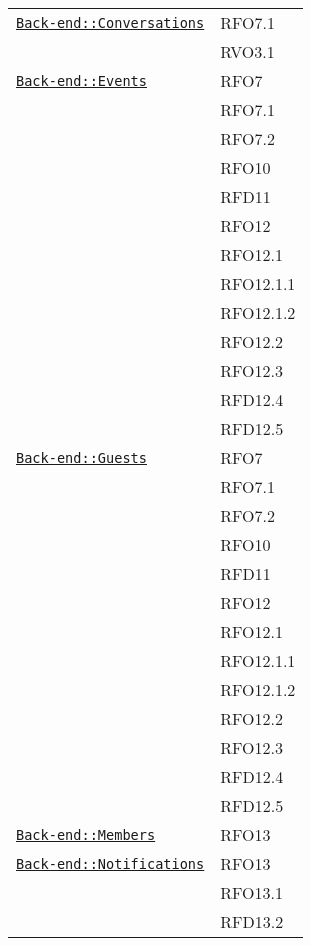 \begin{longtable}{|>{\centering}m{10cm}|m{3cm}<{\centering}|}
\hyperref[Back-end::Conversations]{\texttt{Back-end::Conversations}} & RFO7.1\\
& RVO3.1\\ \hline

\hyperref[Back-end::Events]{\texttt{Back-end::Events}} & RFO7\\
& RFO7.1\\
& RFO7.2\\
& RFO10\\
& RFD11\\
& RFO12\\
& RFO12.1\\
& RFO12.1.1\\
& RFO12.1.2\\
& RFO12.2\\
& RFO12.3\\
& RFD12.4\\
& RFD12.5\\ \hline

\hyperref[Back-end::Guests]{\texttt{Back-end::Guests}} & RFO7\\
& RFO7.1\\
& RFO7.2\\
& RFO10\\
& RFD11\\
& RFO12\\
& RFO12.1\\
& RFO12.1.1\\
& RFO12.1.2\\
& RFO12.2\\
& RFO12.3\\
& RFD12.4\\
& RFD12.5\\ \hline

\hyperref[Back-end::Members]{\texttt{Back-end::Members}} & RFO13\\ \hline

\hyperref[Back-end::Notifications]{\texttt{Back-end::Notifications}} & RFO13\\
& RFO13.1\\
& RFD13.2\\ \hline


\end{longtable}
